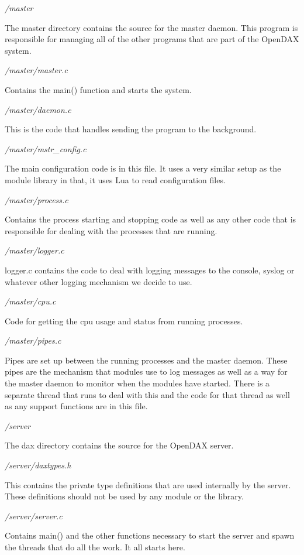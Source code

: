 \emph{/master}

The master directory contains the source for the master daemon.  This program is responsible for managing all of the other programs that are part of the OpenDAX system.

\emph{/master/master.c}

Contains the main() function and starts the system.

\emph{/master/daemon.c}

This is the code that handles sending the program to the background.

\emph{/master/mstr_config.c}

The main configuration code is in this file.  It uses a very similar setup as the module library in that, it uses Lua to read configuration files.

\emph{/master/process.c}

Contains the process starting and stopping code as well as any other code that is responsible for dealing with the processes that are running.

\emph{/master/logger.c}

logger.c contains the code to deal with logging messages to the console, syslog or whatever other logging mechanism we decide to use.

\emph{/master/cpu.c}

Code for getting the cpu usage and status from running processes.

\emph{/master/pipes.c}

Pipes are set up between the running processes and the master daemon.  These pipes are the mechanism that modules use to log messages as well as a way for the master daemon to monitor when the modules have started.  There is a separate thread that runs to deal with this and the code for that thread as well as any support functions are in this file.

\emph{/server}

The dax directory contains the source for the OpenDAX server.

\emph{/server/daxtypes.h}

This contains the private type definitions that are used internally by the server. These definitions should not be used by any module or the library.

\emph{/server/server.c}

Contains main() and the other functions necessary to start the server and spawn the threads that do all the work. It all starts here.

